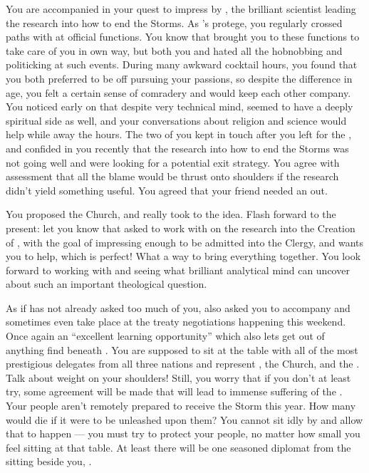 \documentclass[char]{GL2020}
\begin{document}
You are accompanied in your quest to impress \cBeetle{} by \cHeadScientist{\full}, the brilliant scientist leading the research into how to end the Storms. As \cAntiChup{}’s protege, you regularly crossed paths with \cHeadScientist{} at official functions. You know that \cAntiChup{} brought you to these functions to take care of you in \cAntiChup{\their} own way, but both you and \cHeadScientist{} hated all the hobnobbing and politicking at such events. During many awkward cocktail hours, you found that you both preferred to be off pursuing your passions, so despite the difference in age, you felt a certain sense of comradery and would keep each other company. You noticed early on that despite \cHeadScientist{\their} very technical mind,  \cHeadScientist{} seemed to have a deeply spiritual side as well, and your conversations about religion and science would help while away the hours. The two of you kept in touch after you left for the \pSchool{}, and \cHeadScientist{\they} confided in you recently that the research into how to end the Storms was not going well and \cHeadScientist{\they} were looking for a potential exit strategy. You agree with \cHeadScientist{\their} assessment that all the blame would be thrust onto \cHeadScientist{\their} shoulders if the research didn’t yield something useful. You agreed that your friend needed an out. 

You proposed the Church, and \cHeadScientist{\they} really took to the idea. Flash forward to the present: \cHeadScientist{} let you know that \cBeetle{} asked \cHeadScientist{\them} to work with \cEbbPriest{} on the research into the Creation of \pEarth{}, with the goal of impressing \cBeetle{} enough to be admitted into the Clergy, and \cHeadScientist{} wants you to help, which is perfect! What a way to bring everything together. You look forward to working with \cHeadScientist{} and seeing what \cHeadScientist{\their} brilliant analytical mind can uncover about such an important theological question. 

As if \cAntiChup{} has not already asked too much of you, \cAntiChup{\they \have} also asked you to accompany \cAntiChup{\them} and sometimes even take \cAntiChup{\their} place at the treaty negotiations happening this weekend. Once again an “excellent learning opportunity” which also lets \cAntiChup{} get out of anything \cAntiChup{\they} find beneath \cAntiChup{\them}. You are supposed to sit at the table with all of the most prestigious delegates from all three nations and represent \cAntiChup{}, the Church, and the \pTech{}. Talk about weight on your shoulders! Still, you worry that if you don't at least try, some agreement will be made that will lead to immense suffering of the \pTech{}. Your people aren't remotely prepared to receive the Storm this year. How many would die if it were to be unleashed upon them? You cannot sit idly by and allow that to happen — you must try to protect your people, no matter how small you feel sitting at that table. At least there will be one seasoned diplomat from the \pTech{} sitting beside you, \cDiplomat{\full}.
\end{document}
